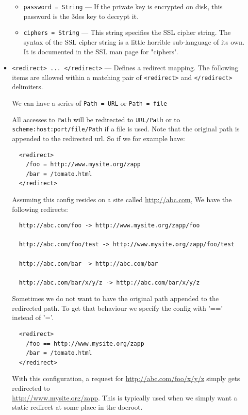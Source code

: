 \documentclass[11pt,oneside,english]{book}
\begin{document}
\begin{itemize}
\begin{itemize}
               \item \verb+password = String+ --- If the private key is
                 encrypted on disk, this password is the 3des key to decrypt it.

               \item \verb+ciphers = String+ --- This string specifies the SSL
                 cipher string.  The syntax of the SSL cipher string is a little
                 horrible sub-language of its own.  It is documented in the SSL
                 man page for "ciphers".
               \end{itemize}

\item       \verb+<redirect> ... </redirect>+ ---
              Defines a redirect mapping. The following items are allowed within
              a matching pair of \verb+<redirect>+ and \verb+</redirect>+ delimiters.

              We can have a series of \verb+Path = URL+ or \verb+Path = file+

              All accesses to \verb+Path+ will be redirected to \verb+URL/Path+
              or to \verb+scheme:host:port/file/Path+ if a file is
              used. Note that the original path is appended to the redirected
              url. So if we for example have:
\begin{verbatim}
  <redirect>
    /foo = http://www.mysite.org/zapp
    /bar = /tomato.html
  </redirect>
\end{verbatim}
              Assuming this config resides on a site called
              \url{http://abc.com}, We have the following redirects:
\begin{verbatim}
  http://abc.com/foo -> http://www.mysite.org/zapp/foo

  http://abc.com/foo/test -> http://www.mysite.org/zapp/foo/test

  http://abc.com/bar -> http://abc.com/bar

  http://abc.com/bar/x/y/z -> http://abc.com/bar/x/y/z
\end{verbatim}
              Sometimes we do not want to have the original path appended to the
              redirected path. To get that behaviour we specify the config with
              '==' instead of '='.
\begin{verbatim}
  <redirect>
    /foo == http://www.mysite.org/zapp
    /bar = /tomato.html
  </redirect>
\end{verbatim}
              With this configuration, a request for
              \url{http://abc.com/foo/x/y/z} simply gets redirected to \\
              \url{http://www.mysite.org/zapp}. This is typically used when
              we simply want a static redirect at some place in the
              docroot.


\end{itemize}
\end{document}
